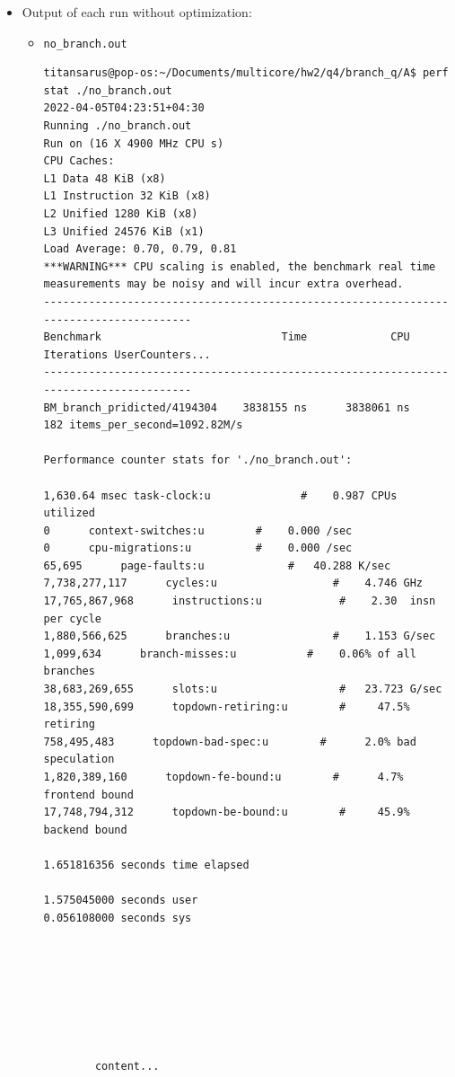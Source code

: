 \documentclass[12pt]{article}
\begin{document}
\begin{itemize}
	\item 
	Output of each run without optimization:
	\begin{itemize}
		\item \Verb+no_branch.out+
		
		\lstset{
			basicstyle=\small\ttfamily,
			columns=flexible,
			breaklines=true
		}
\begin{lstlisting}
titansarus@pop-os:~/Documents/multicore/hw2/q4/branch_q/A$ perf stat ./no_branch.out 
2022-04-05T04:23:51+04:30
Running ./no_branch.out
Run on (16 X 4900 MHz CPU s)
CPU Caches:
L1 Data 48 KiB (x8)
L1 Instruction 32 KiB (x8)
L2 Unified 1280 KiB (x8)
L3 Unified 24576 KiB (x1)
Load Average: 0.70, 0.79, 0.81
***WARNING*** CPU scaling is enabled, the benchmark real time measurements may be noisy and will incur extra overhead.
--------------------------------------------------------------------------------------
Benchmark                            Time             CPU   Iterations UserCounters...
--------------------------------------------------------------------------------------
BM_branch_pridicted/4194304    3838155 ns      3838061 ns          182 items_per_second=1092.82M/s

Performance counter stats for './no_branch.out':

1,630.64 msec task-clock:u              #    0.987 CPUs utilized          
0      context-switches:u        #    0.000 /sec                   
0      cpu-migrations:u          #    0.000 /sec                   
65,695      page-faults:u             #   40.288 K/sec                  
7,738,277,117      cycles:u                  #    4.746 GHz                    
17,765,867,968      instructions:u            #    2.30  insn per cycle         
1,880,566,625      branches:u                #    1.153 G/sec                  
1,099,634      branch-misses:u           #    0.06% of all branches        
38,683,269,655      slots:u                   #   23.723 G/sec                  
18,355,590,699      topdown-retiring:u        #     47.5% retiring              
758,495,483      topdown-bad-spec:u        #      2.0% bad speculation       
1,820,389,160      topdown-fe-bound:u        #      4.7% frontend bound        
17,748,794,312      topdown-be-bound:u        #     45.9% backend bound         

1.651816356 seconds time elapsed

1.575045000 seconds user
0.056108000 seconds sys



		
	\end{lstlisting}

	\begin{verbatim}
		
		
	\end{verbatim}

	\begin{verbatim}
		content...
	\end{verbatim}
\end{itemize}
\end{itemize}
\end{document}
